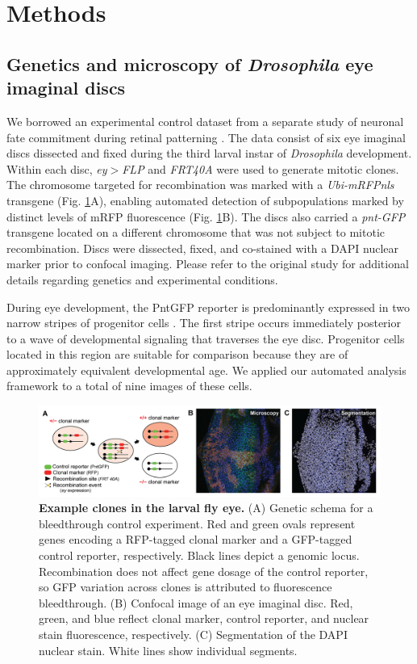 
\section{Methods}

\subsection{Genetics and microscopy of \textit{Drosophila} eye imaginal discs}

We borrowed an experimental control dataset from a separate study of neuronal fate commitment during retinal patterning \cite{Bernasek2018}. The data consist of six eye imaginal discs dissected and fixed during the third larval instar of \textit{Drosophila} development. Within each disc, \textit{ey$>$FLP} and \textit{FRT40A} were used to generate mitotic clones. The chromosome targeted for recombination was marked with a \textit{Ubi-mRFPnls} transgene (Fig. \ref{fig:figS1}A), enabling automated detection of subpopulations marked by distinct levels of mRFP fluorescence (Fig. \ref{fig:figS1}B). The discs also carried a \textit{pnt-GFP} transgene located on a different chromosome that was not subject to mitotic recombination. Discs were dissected, fixed, and co-stained with a DAPI nuclear marker prior to confocal imaging. Please refer to the original study for additional details regarding genetics and experimental conditions. 

During eye development, the PntGFP reporter is predominantly expressed in two narrow stripes of progenitor cells \cite{Bernasek2018}. The first stripe occurs immediately posterior to a wave of developmental signaling that traverses the eye disc. Progenitor cells located in this region are suitable for comparison because they are of approximately equivalent developmental age. We applied our automated analysis framework to a total of nine images of these cells.

\begin{figure}[h!]
\includegraphics[width=0.95\columnwidth]{./figure_S1}
\caption[Example clones in the larval fly eye.]{\textbf{Example clones in the larval fly eye.} (A) Genetic schema for a bleedthrough control experiment. Red and green ovals represent genes encoding a RFP-tagged clonal marker and a GFP-tagged control reporter, respectively. Black lines depict a genomic locus. Recombination does not affect gene dosage of the control reporter, so GFP variation across clones is attributed to fluorescence bleedthrough. (B) Confocal image of an eye imaginal disc. Red, green, and blue reflect clonal marker, control reporter, and nuclear stain fluorescence, respectively. (C) Segmentation of the DAPI nuclear stain. White lines show individual segments.}
\label{fig:figS1}
\end{figure}


